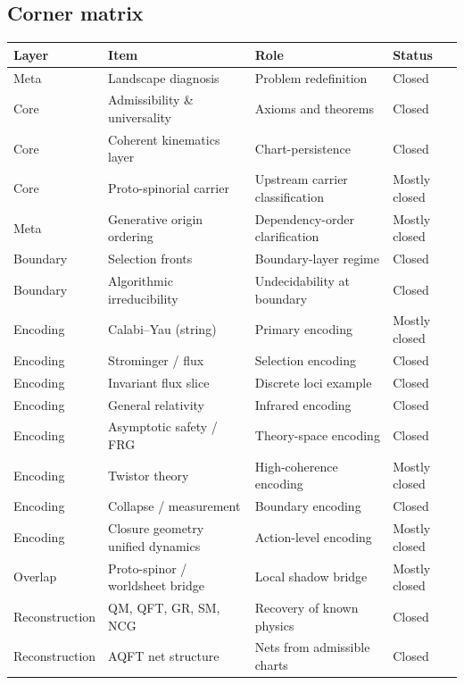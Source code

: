 \documentclass[11pt]{article}
\begin{document}
\subsection{Corner matrix}

\begin{center}
\begin{tabular}{|l|l|l|l|}
\hline
\textbf{Layer} & \textbf{Item} & \textbf{Role} & \textbf{Status} \\
\hline
Meta & Landscape diagnosis & Problem redefinition & Closed \\
\hline
Core & Admissibility \& universality & Axioms and theorems & Closed \\
\hline
Core & Coherent kinematics layer & Chart-persistence & Closed \\
\hline
Core & Proto-spinorial carrier & Upstream carrier classification & Mostly closed \\
\hline
Meta & Generative origin ordering & Dependency-order clarification & Mostly closed \\
\hline
Boundary & Selection fronts & Boundary-layer regime & Closed \\
\hline
Boundary & Algorithmic irreducibility & Undecidability at boundary & Closed \\
\hline
Encoding & Calabi--Yau (string) & Primary encoding & Mostly closed \\
\hline
Encoding & Strominger / flux & Selection encoding & Closed \\
\hline
Encoding & Invariant flux slice & Discrete loci example & Closed \\
\hline
Encoding & General relativity & Infrared encoding & Closed \\
\hline
Encoding & Asymptotic safety / FRG & Theory-space encoding & Closed \\
\hline
Encoding & Twistor theory & High-coherence encoding & Mostly closed \\
\hline
Encoding & Collapse / measurement & Boundary encoding & Closed \\
\hline
Encoding & Closure geometry unified dynamics & Action-level encoding & Mostly closed \\
\hline
Overlap & Proto-spinor / worldsheet bridge & Local shadow bridge & Mostly closed \\
\hline
Reconstruction & QM, QFT, GR, SM, NCG & Recovery of known physics & Closed \\
\hline
Reconstruction & AQFT net structure & Nets from admissible charts & Closed \\

\end{tabular}
\end{center}
\end{document}
